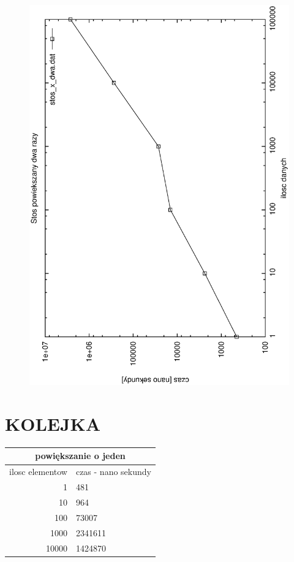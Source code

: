 \documentclass[a4paper,11pt]{report}
\begin{document}
\begin{figure}
  \begin{center}
    \includegraphics{wykresy/stos_x_dwa.eps}
    \caption{}
    \label{fig:}
  \end{center}
\end{figure}

\section{KOLEJKA}
\begin{tabular}{|rl|}
\hline
\multicolumn{2}{|c|}{powiększanie o jeden}\\
\hline
ilosc elementow & czas - nano sekundy\\
\hline
1&481\\
10&964\\
100&73007\\
1000&2341611\\
10000&1424870\\
\hline
\end{tabular}
\end{document}
